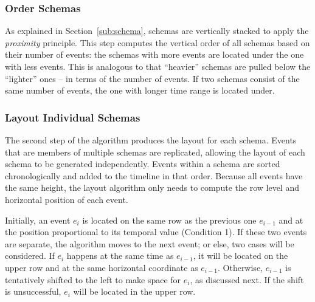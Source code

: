\subsubsection{Order Schemas}
As explained in Section~\ref{sub:schema}, schemas are vertically stacked to apply the \emph{proximity} principle. This step computes the vertical order of all schemas based on their number of events: the schemas with more events are located under the one with less events. This is analogous to that ``heavier'' schemas are pulled below the ``lighter'' ones -- in terms of the number of events. If two schemas consist of the same number of events, the one with longer time range is located under.


\subsubsection{Layout Individual Schemas}
\label{sub:layout-schema}
The second step of the algorithm produces the layout for each schema. Events that are members of multiple schemas are replicated, allowing the layout of each schema to be generated independently. Events within a schema are sorted chronologically and added to the timeline in that order. Because all events have the same height, the layout algorithm only needs to compute the row level and horizontal position of each event. 

Initially, an event $e_i$ is located on the same row as the previous one $e_{i-1}$ and at the position proportional to its temporal value (Condition 1). If these two events are separate, the algorithm moves to the next event; or else, two cases will be considered. If $e_i$ happens at the same time as $e_{i-1}$, it will be located on the upper row and at the same horizontal coordinate as $e_{i-1}$. Otherwise, $e_{i-1}$ is tentatively shifted to the left to make space for $e_i$, as discussed next. If the shift is unsuccessful, $e_i$ will be located in the upper row.

